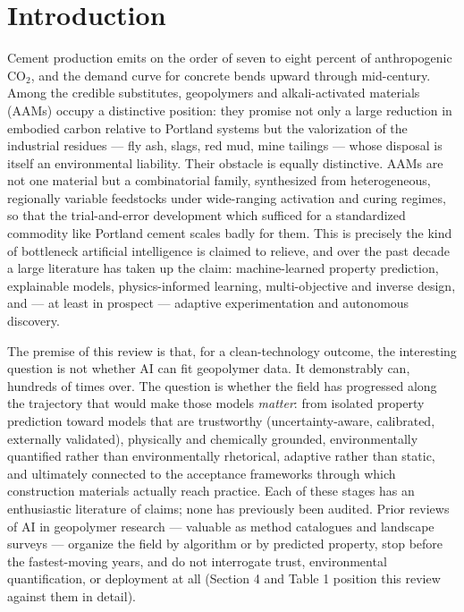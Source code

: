 \documentclass[pdflatex,sn-basic]{sn-jnl}
\begin{document}

\maketitle

\section{Introduction}

Cement production emits on the order of seven to eight percent of anthropogenic CO$_2$, and the demand curve for concrete bends upward through mid-century. Among the credible substitutes, geopolymers and alkali-activated materials (AAMs) occupy a distinctive position: they promise not only a large reduction in embodied carbon relative to Portland systems but the valorization of the industrial residues --- fly ash, slags, red mud, mine tailings --- whose disposal is itself an environmental liability. Their obstacle is equally distinctive. AAMs are not one material but a combinatorial family, synthesized from heterogeneous, regionally variable feedstocks under wide-ranging activation and curing regimes, so that the trial-and-error development which sufficed for a standardized commodity like Portland cement scales badly for them. This is precisely the kind of bottleneck artificial intelligence is claimed to relieve, and over the past decade a large literature has taken up the claim: machine-learned property prediction, explainable models, physics-informed learning, multi-objective and inverse design, and --- at least in prospect --- adaptive experimentation and autonomous discovery.

The premise of this review is that, for a clean-technology outcome, the interesting question is not whether AI can fit geopolymer data. It demonstrably can, hundreds of times over. The question is whether the field has progressed along the trajectory that would make those models \emph{matter}: from isolated property prediction toward models that are trustworthy (uncertainty-aware, calibrated, externally validated), physically and chemically grounded, environmentally quantified rather than environmentally rhetorical, adaptive rather than static, and ultimately connected to the acceptance frameworks through which construction materials actually reach practice. Each of these stages has an enthusiastic literature of claims; none has previously been audited. Prior reviews of AI in geopolymer research --- valuable as method catalogues and landscape surveys --- organize the field by algorithm or by predicted property, stop before the fastest-moving years, and do not interrogate trust, environmental quantification, or deployment at all (Section 4 and Table 1 position this review against them in detail).
\end{document}
